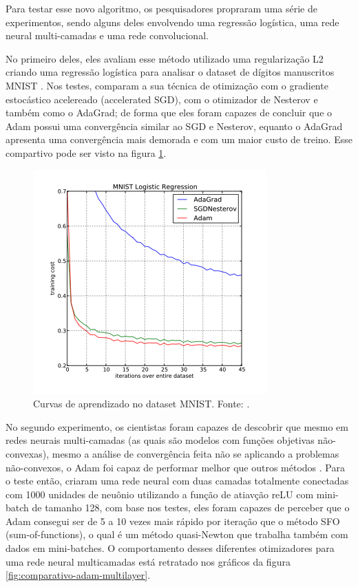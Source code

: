 Para testar esse novo algoritmo, os pesquisadores \textcite{AdamMethod} propraram uma série de experimentos, sendo alguns deles envolvendo uma regressão logística, uma rede neural multi-camadas e uma rede convolucional.

No primeiro deles, eles avaliam esse método utilizado uma regularização L2 criando uma regressão logística para analisar o dataset de dígitos manuscritos MNIST \parencite{AdamMethod}. Nos testes, \textcite{AdamMethod} comparam a sua técnica de otimização com o gradiente estocástico acelereado (accelerated SGD), com o otimizador de Nesterov e também como o AdaGrad; de forma que eles foram capazes de concluir que o Adam possui uma convergência similar ao SGD e Nesterov, equanto o AdaGrad apresenta uma convergência mais demorada e com um maior custo de treino. Esse compartivo pode ser visto na figura \ref{fig:comparativo-adam-mnist}.

\begin{figure}[h]
    \centering
    \includegraphics[width=0.65\linewidth]{../imagens/retropropagacao-gradiente/comparativo-adam-mnist.png}
    
    \caption[Curvas de aprendizado no dataset MNIST]{%
        Curvas de aprendizado no dataset MNIST.
        \newline
        \small Fonte: \parencite{AdamMethod}.
    }
    \label{fig:comparativo-adam-mnist}
\end{figure}

No segundo experimento, os cientistas foram capazes de descobrir que mesmo em redes neurais multi-camadas (as quais são modelos com funções objetivas não-convexas), mesmo a análise de convergência feita não se aplicando a problemas não-convexos, o Adam foi capaz de performar melhor que outros métodos \parencite{AdamMethod}. Para o teste então, \textcite{AdamMethod} criaram uma rede neural com duas camadas totalmente conectadas com 1000 unidades de neuônio utilizando a função de atiavção reLU com mini-batch de tamanho 128, com base nos testes, eles foram capazes de perceber que o Adam consegui ser de 5 a 10 vezes mais rápido por iteração que o método SFO (sum-of-functions), o qual é um método quasi-Newton que trabalha também com dados em mini-batches. O comportamento desses diferentes otimizadores para uma rede neural multicamadas está retratado nos gráficos da figura \ref{fig:comparativo-adam-multilayer}.

